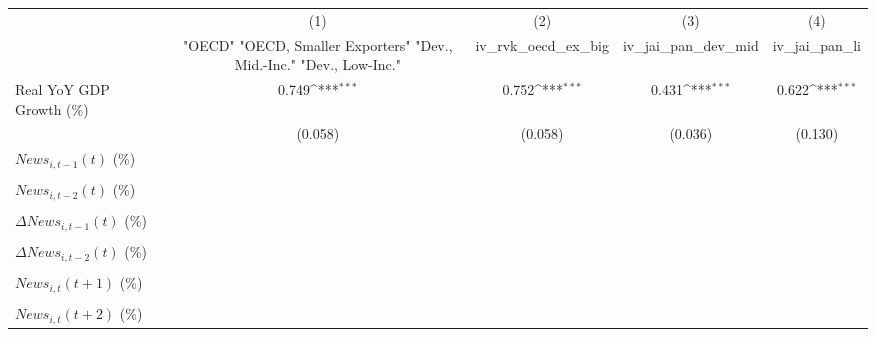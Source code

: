 {
\def\sym#1{\ifmmode^{#1}\else\(^{#1}\)\fi}
\begin{tabular}{l*{4}{c}}
\toprule
                    &\multicolumn{1}{c}{(1)}&\multicolumn{1}{c}{(2)}&\multicolumn{1}{c}{(3)}&\multicolumn{1}{c}{(4)}\\
                    &\multicolumn{1}{c}{ "OECD" "OECD, Smaller Exporters" "Dev., Mid.-Inc." "Dev., Low-Inc."}&\multicolumn{1}{c}{iv_rvk_oecd_ex_big}&\multicolumn{1}{c}{iv_jai_pan_dev_mid}&\multicolumn{1}{c}{iv_jai_pan_li}\\
\midrule
Real YoY GDP Growth (\%)&       0.749\sym{***}&       0.752\sym{***}&       0.431\sym{***}&       0.622\sym{***}\\
                    &     (0.058)         &     (0.058)         &     (0.036)         &     (0.130)         \\
\addlinespace
$ News_{i,t-1}(t)$ (\%)&                     &                     &                     &                     \\
                    &                     &                     &                     &                     \\
\addlinespace
$ News_{i,t-2}(t)$ (\%)&                     &                     &                     &                     \\
                    &                     &                     &                     &                     \\
\addlinespace
$ \Delta News_{i,t-1}(t)$ (\%)&                     &                     &                     &                     \\
                    &                     &                     &                     &                     \\
\addlinespace
$ \Delta News_{i,t-2}(t)$ (\%)&                     &                     &                     &                     \\
                    &                     &                     &                     &                     \\
\addlinespace
$ News_{i,t}(t+1)$ (\%)&                     &                     &                     &                     \\
                    &                     &                     &                     &                     \\
\addlinespace
$ News_{i,t}(t+2)$ (\%)&                     &                     &                     &                     \\

\end{tabular}}
